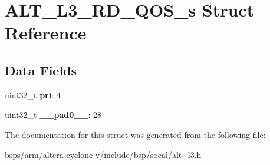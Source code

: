 \hypertarget{structALT__L3__RD__QOS__s}{}\section{A\+L\+T\+\_\+\+L3\+\_\+\+R\+D\+\_\+\+Q\+O\+S\+\_\+s Struct Reference}
\label{structALT__L3__RD__QOS__s}
\subsection*{Data Fields}
\begin{DoxyCompactItemize}
\item 
\mbox{\label{structALT__L3__RD__QOS__s_a0441123f04b7c6e65eba9114dfe7c388}} 
uint32\+\_\+t {\bfseries pri}\+: 4
\item 
\mbox{\label{structALT__L3__RD__QOS__s_ad89eb6b3796060fcb6118f2b4ce1c30f}} 
uint32\+\_\+t {\bfseries \+\_\+\+\_\+pad0\+\_\+\+\_\+}\+: 28
\end{DoxyCompactItemize}


The documentation for this struct was generated from the following file\+:\begin{DoxyCompactItemize}
\item 
bsps/arm/altera-\/cyclone-\/v/include/bsp/socal/\mbox{\hyperlink{alt__l3_8h}{alt\+\_\+l3.\+h}}\end{DoxyCompactItemize}
